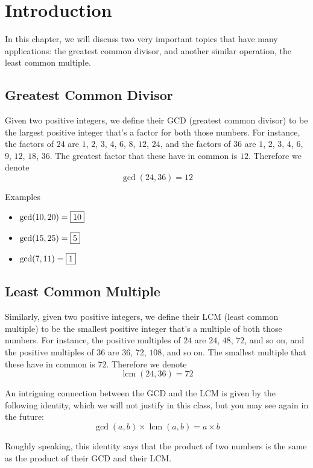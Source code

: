 \documentclass[a4paper,10pt]{report}
\begin{document}
\section{Introduction}

In this chapter, we will discuss two very important
topics that have many applications: the greatest common divisor, and another
similar operation, the least common multiple.

\subsection{Greatest Common Divisor}

Given two positive integers, we define their GCD (greatest common divisor) to be
the largest positive integer that's a factor for both those numbers. For
instance, the factors of $24$ are $1$, $2$, $3$, $4$, $6$, $8$, $12$, $24$, and
the factors of $36$ are $1$, $2$, $3$, $4$, $6$, $9$, $12$, $18$, $36$. The
greatest factor that these have in common is $12$. Therefore we denote \[
 \gcd(24, 36) = 12
\]

\begin{problem}{Examples}
 \begin{itemize}
  \item $\gcd(10, 20) = \Ans{10}$
  \item $\gcd(15, 25) = \Ans{5}$
  \item $\gcd(7, 11) = \Ans{1}$
 \end{itemize}
\end{problem}

\subsection{Least Common Multiple}
Similarly, given two positive integers, we define their LCM (least common
multiple) to be the smallest positive integer that's a multiple of both those
numbers. For instance, the positive multiples of $24$ are $24$, $48$, $72$, and
so on, and the positive multiples of $36$ are $36$, $72$, $108$, and so on.
The smallest multiple that these have in common is $72$. Therefore we
denote \[
 \operatorname{lcm}(24, 36) = 72
\]

An intriguing connection between the GCD and the LCM is given by the following
identity, which we will not justify in this class, but you may see again in the
future: \[
 \gcd(a, b) \times \operatorname{lcm}(a, b) = a \times b
\]

Roughly speaking, this identity says that the product of two numbers is the same
as the product of their GCD and their LCM.
\end{document}
